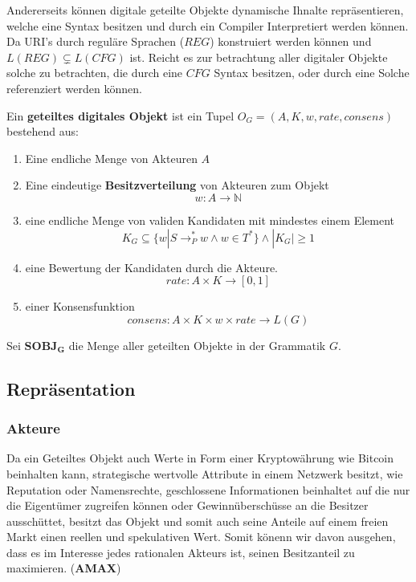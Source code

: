 \documentclass[]{article}
\newtheorem{mydef}{Definition}
\begin{document}
Andererseits können digitale geteilte Objekte dynamische Ihnalte repräsentieren, welche eine Syntax besitzen und durch ein Compiler Interpretiert werden können. Da URI's durch reguläre Sprachen ($REG$) konstruiert werden können und $L(REG) \subsetneq L(CFG)$ ist. Reicht es zur betrachtung aller digitaler Objekte 
solche zu betrachten, die durch eine $CFG$ Syntax besitzen, oder durch eine Solche referenziert werden können.

Ein \textbf{geteiltes digitales Objekt} ist ein Tupel $O_G=(A, K, w, rate, consens)$ bestehend aus:

\begin{enumerate}
\item Eine endliche Menge von Akteuren $A$
\item Eine eindeutige \textbf{Besitzverteilung} von Akteuren zum Objekt
  \[w: A \rightarrow \mathbb{N}\]
\item eine endliche Menge von validen Kandidaten mit mindestes einem Element 
  \[K_G \subseteq \{w|S \rightarrow^*_P w \land w\in T^* \} \land |K_G| \geq 1\] 
\item eine Bewertung der Kandidaten durch die Akteure. 
  \[rate: A\times K \rightarrow [0,1]\]
\item einer Konsensfunktion
  \[consens: A\times K\times w \times rate \rightarrow L(G)\] 
\end{enumerate}

Sei $\mathbf{SOBJ_G}$ die Menge aller geteilten Objekte in der Grammatik $G$.


\subsection {Repräsentation}

\subsubsection {Akteure}


Da ein Geteiltes Objekt auch Werte in Form einer Kryptowährung wie Bitcoin beinhalten kann, strategische wertvolle Attribute in einem Netzwerk besitzt, wie Reputation oder Namensrechte, geschlossene Informationen beinhaltet auf die nur die Eigentümer zugreifen können oder Gewinnüberschüsse an die Besitzer ausschüttet, besitzt das Objekt und somit auch seine Anteile auf einem freien Markt einen reellen und spekulativen Wert. Somit könenn wir davon ausgehen, dass es im Interesse jedes rationalen Akteurs ist, seinen Besitzanteil zu maximieren. (\textbf{AMAX})
\end{document}
